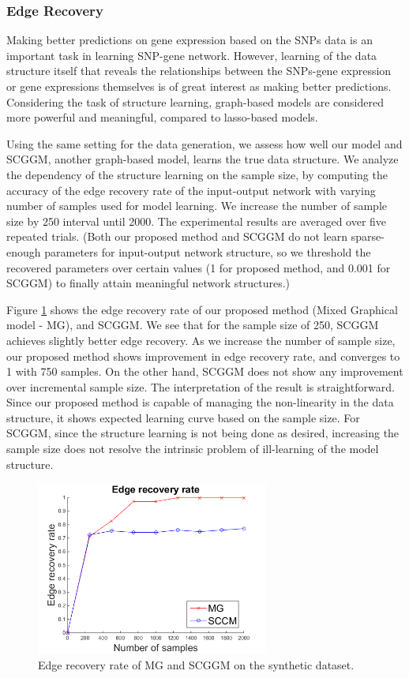 \documentclass{article}
\begin{document}
\subsubsection{Edge Recovery}
Making better predictions on gene expression based on the SNPs data is an important task in learning SNP-gene network. However, learning of the data structure itself that reveals the relationships between the SNPs-gene expression or gene expressions themselves is of great interest as making better predictions. Considering the task of structure learning, graph-based models are considered more powerful and meaningful, compared to lasso-based models.

Using the same setting for the data generation, we assess how well our model and SCGGM, another graph-based model, learns the true data structure.
We analyze the dependency of the structure learning on the sample size, by computing the accuracy of the edge recovery rate of the input-output network with varying number of samples used for model learning.
We increase the number of sample size by 250 interval until 2000.
The experimental results are averaged over five repeated trials.
(Both our proposed method and SCGGM do not learn sparse-enough parameters for input-output network structure, so we threshold the recovered parameters over certain values (1 for proposed method, and 0.001 for SCGGM) to finally attain meaningful network structures.)

Figure \ref{fig:syn_edge_rec} shows the edge recovery rate of our proposed method (Mixed Graphical model - MG), and SCGGM.
We see that for the sample size of 250, SCGGM achieves slightly better edge recovery. 
As we increase the number of sample size, our proposed method shows improvement in edge recovery rate, and converges to 1 with 750 samples. 
On the other hand, SCGGM does not show any improvement over incremental sample size.
The interpretation of the result is straightforward.
Since our proposed method is capable of managing the non-linearity in the data structure, it shows expected learning curve based on the sample size.
For SCGGM, since the structure learning is not being done as desired, increasing the sample size does not resolve the intrinsic problem of ill-learning of the model structure.

\begin{figure}[h]
  \centering
  \includegraphics[width=3in]{figure/EdgeRecRate2.png}
  \caption[] {Edge recovery rate of MG and SCGGM on the synthetic dataset.\label{fig:syn_edge_rec}}
\end{figure}
\end{document}
